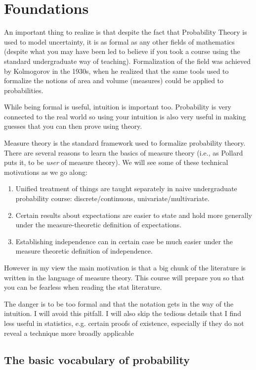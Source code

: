 \documentclass{article}
\begin{document}
\section{Foundations}

  An important thing to realize is that despite the fact that Probability Theory is used to model uncertainty, it is as formal as any other fields of mathematics (despite what you may have been led to believe if you took a course using the standard undergraduate way of teaching). Formalization of the field was achieved by Kolmogorov in the 1930s, when he realized that the same tools used to formalize the notions of area and volume (measures) could be applied to probabilities. 

 While being formal is useful, intuition is important too. Probability is very connected to the real world so using your intuition is also very useful in making guesses that you can then prove using theory.

 Measure theory is the standard framework used to formalize probability theory. There are several reasons to learn the basics of measure theory (i.e., as Pollard puts it, to be \emph{user} of measure theory). We will see some of these technical motivations as we go along: 
\begin{enumerate}
	\item Unified treatment of things are taught separately in naive undergraduate probability course: discrete/continuous, univariate/multivariate. 
	\item Certain results about expectations are easier to state and hold more generally under the measure-theoretic definition of expectations.
	\item Establishing independence can in certain case be much easier under the measure theoretic definition of independence.
\end{enumerate}
However in my view the main motivation is that a big chunk of the literature is written in the language of measure theory. This course will prepare you so that you can be fearless when reading the stat literature. 

The danger is to be too formal and that the notation gets in the way of the intuition. I will avoid this pitfall. I will also skip the tedious details that I find less useful in statistics, e.g. certain proofs of existence, especially if they do not reveal a technique more broadly applicable 


\subsection{The basic vocabulary of probability}
\end{document}

